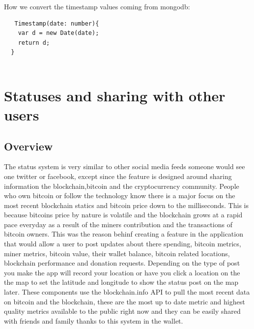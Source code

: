 How we convert the timestamp values coming from mongodb:
\begin{lstlisting}
   Timestamp(date: number){
    var d = new Date(date);
    return d;
  }
  
\end{lstlisting}

\section{Statuses and sharing with other users}

\subsection{Overview}
The status system is very similar to other social media feeds someone would see one twitter or facebook, except since the feature is designed around sharing information the blockchain,bitcoin and the cryptocurrency community. People who own bitcoin or follow the technology know there is a major focus on the most recent blockchain statics and bitcoin price down to the milliseconds. This is because bitcoins price by nature is volatile and the blockchain grows at a rapid pace everyday as a result of the miners contribution and the transactions of bitcoin owners. This was the reason behinf creating a feature in the application that would allow a user to post updates about there spending, bitcoin metrics, miner metrics, bitcoin value, their wallet balance, bitcoin related locations, blockchain performance and donation requests. Depending on the type of post you make the app will record your location or have you click a location on the the map to set the latitude and longitude to show the status post on the map later. These components use the blockchain.info API to pull the most recent data on bitcoin and the blockchain, these are the most up to date metric and highest quality metrics available to the public right now and they can be easily shared with friends and family thanks to this system in the wallet.


